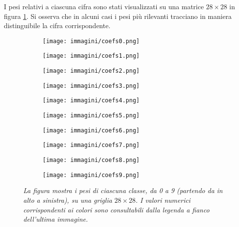 \documentclass{article}
\begin{document}
I pesi relativi a ciascuna cifra sono stati visualizzati su una matrice $28 \times 28$ in figura \ref{fig:pesi}.
Si osserva che in alcuni casi i pesi più rilevanti tracciano in maniera distinguibile la cifra corrispondente.

\begin{figure}[hbtp]
    \centering
    \begin{subfigure}[b]{0.29\textwidth}
        \centering
        \texttt{[image: immagini/coefs0.png]}
    \end{subfigure}
    \begin{subfigure}[b]{0.29\textwidth}
        \centering
        \texttt{[image: immagini/coefs1.png]}
    \end{subfigure}
    \begin{subfigure}[b]{0.29\textwidth}
        \centering
        \texttt{[image: immagini/coefs2.png]}
    \end{subfigure}
    \begin{subfigure}[b]{0.29\textwidth}
        \centering
        \texttt{[image: immagini/coefs3.png]}
    \end{subfigure}
    \begin{subfigure}[b]{0.29\textwidth}
        \centering
        \texttt{[image: immagini/coefs4.png]}
    \end{subfigure}
    \begin{subfigure}[b]{0.29\textwidth}
        \centering
        \texttt{[image: immagini/coefs5.png]}
    \end{subfigure}
    \begin{subfigure}[b]{0.29\textwidth}
        \centering
        \texttt{[image: immagini/coefs6.png]}
    \end{subfigure}
    \begin{subfigure}[b]{0.29\textwidth}
        \centering
        \texttt{[image: immagini/coefs7.png]}
    \end{subfigure}
    \begin{subfigure}[b]{0.29\textwidth}
        \centering
        \texttt{[image: immagini/coefs8.png]}
    \end{subfigure}
    \begin{subfigure}[b]{0.29\textwidth}
        \centering
        \texttt{[image: immagini/coefs9.png]}
    \end{subfigure}
    \caption{\emph{La figura mostra i pesi di ciascuna classe, da 0 a 9 (partendo da in alto a sinistra), su una griglia $28 \times 28$. I valori numerici corrispondenti ai colori sono consultabili dalla legenda a fianco dell'ultima immagine.}}
    \label{fig:pesi}
\end{figure}
\end{document}
